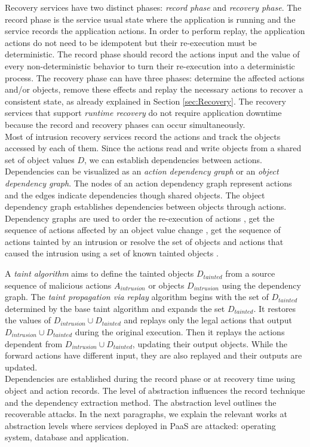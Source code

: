 Recovery services have two distinct phases: \textit{record phase} and \textit{recovery phase}. The record phase is the service usual state where the application is running and the service records the application actions. In order to perform replay, the application actions do not need to be idempotent but their re-execution must be deterministic. The record phase should record the actions input and the value of every non-deterministic behavior to turn their re-execution into a deterministic process. The recovery phase can have three phases: determine the affected actions and/or objects, remove these effects and replay the necessary actions to recover a consistent state, as already explained in Section \ref{sec:Recovery}. The recovery services that support \textit{runtime recovery} do not require application downtime because the record and recovery phases can occur simultaneously.\\


Most of intrusion recovery services record the actions and track the objects accessed by each of them. Since the actions read and write objects from a shared set of object values $D$, we can establish dependencies between actions. Dependencies can be visualized as an \textit{action dependency graph} or an \textit{object dependency graph}. The nodes of an action dependency graph represent actions and the edges indicate dependencies though shared objects. The object dependency graph establishes dependencies between objects through actions. Dependency graphs are used to order the re-execution of actions \cite{undoForOperators}, get the sequence of actions affected by an object value change \cite{warp}, get the sequence of actions tainted by an intrusion \cite{Akkus2010} or resolve the set of objects and actions that caused the intrusion using a set of known tainted objects \cite{backtracker}. 

A \textit{taint algorithm} aims to define the tainted objects $D_{tainted}$ from a source sequence of malicious actions $A_{intrusion}$ or objects $D_{intrusion}$ using the dependency graph. The \textit{taint propagation via replay} \cite{retro} algorithm begins with the set of $D_{tainted}$ determined by the base taint algorithm and expands the set $D_{tainted}$. It restores the values of $D_{intrusion} \cup D_{tainted}$ and replays only the legal actions that output $D_{intrusion} \cup D_{tainted}$ during the original execution. Then it replays the actions dependent from $D_{intrusion} \cup D_{tainted}$, updating their output objects. While the forward actions have different input, they are also replayed and their outputs are updated.\\

Dependencies are established during the record phase or at recovery time using object and action records. The level of abstraction influences the record technique and the dependency extraction method. The abstraction level outlines the recoverable attacks. In the next paragraphs, we explain the relevant works at abstraction levels where services deployed in PaaS are attacked: operating system, database and application.\\


